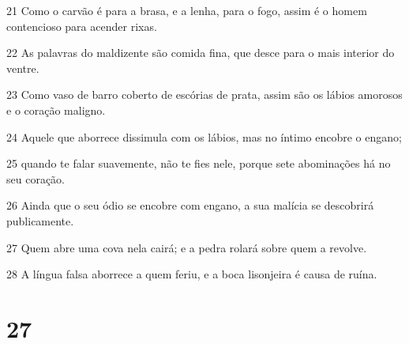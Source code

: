 \par 21 Como o carvão é para a brasa, e a lenha, para o fogo, assim é o homem contencioso para acender rixas.
\par 22 As palavras do maldizente são comida fina, que desce para o mais interior do ventre.
\par 23 Como vaso de barro coberto de escórias de prata, assim são os lábios amorosos e o coração maligno.
\par 24 Aquele que aborrece dissimula com os lábios, mas no íntimo encobre o engano;
\par 25 quando te falar suavemente, não te fies nele, porque sete abominações há no seu coração.
\par 26 Ainda que o seu ódio se encobre com engano, a sua malícia se descobrirá publicamente.
\par 27 Quem abre uma cova nela cairá; e a pedra rolará sobre quem a revolve.
\par 28 A língua falsa aborrece a quem feriu, e a boca lisonjeira é causa de ruína.

\chapter{27}

